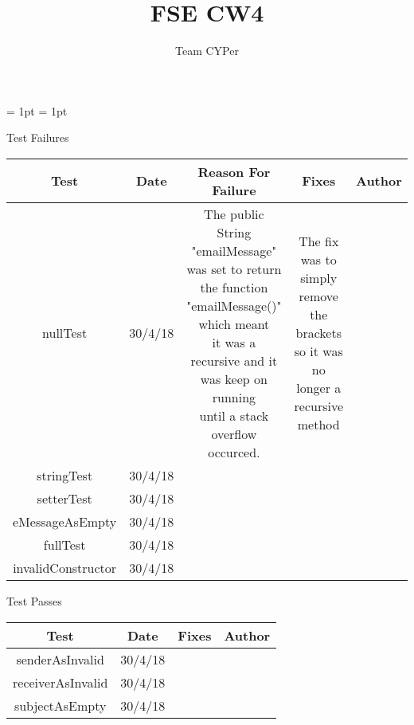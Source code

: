 \documentclass{article}
\begin{document}
\oddsidemargin = 1pt
\evensidemargin = 1pt


    \title{FSE CW4}
    \author{Team CYPer}

    \maketitle
    \begin{center}

    \huge Test Failures \\
    \vspace{10mm}
    \small
    \begin{tabular}{|c|c|c|c|c|}
        \hline
        Test & Date & Reason For Failure & Fixes & Author \\
        \hline
        nullTest & 30/4/18 & \makecell{The public String "emailMessage" was set to return \\ the function "emailMessage()"
        which meant \\ it was a recursive and it was keep on running \\ until a stack overflow occurced.} &
        \makecell {The fix was to simply remove the \\ brackets so it was no \\ longer a recursive method} \\
        \hline

        stringTest & 30/4/18 \\
        setterTest & 30/4/18 \\
        eMessageAsEmpty & 30/4/18 \\
        fullTest & 30/4/18 \\
        invalidConstructor & 30/4/18 \\
        \hline
    \end{tabular}

    \vspace{10mm}
    \huge Test Passes \\
    \vspace{10mm}
    \small
    \begin{tabular}{|c|c|c|c|}
        \hline
        Test & Date & Fixes & Author \\
        \hline
        senderAsInvalid & 30/4/18 \\
        receiverAsInvalid & 30/4/18 \\
        subjectAsEmpty & 30/4/18 \\
        \hline
    \end{tabular}



    \end{center}
\end{document}

